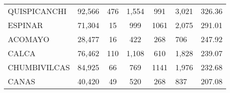 \begin{tabular}{lrccclr}
		\cellcolor[HTML]{FFE699}QUISPICANCHI                           & 92,566                                                         & 476                                                         & 1,554                & 991                      & 3,021                                                               & 326.36                                                                       \\
		\cellcolor[HTML]{FFE699}ESPINAR                                & 71,304                                                         & 15                                                          & 999                  & 1061                     & 2,075                                                               & 291.01                                                                       \\
		\cellcolor[HTML]{FFE699}ACOMAYO                                & 28,477                                                         & 16                                                          & 422                  & 268                      & 706                                                                 & 247.92                                                                       \\
		\cellcolor[HTML]{FFE699}CALCA                                  & 76,462                                                         & 110                                                         & 1,108                & 610                      & 1,828                                                               & 239.07                                                                       \\
		\cellcolor[HTML]{FFE699}CHUMBIVILCAS                           & 84,925                                                         & 66                                                          & 769                  & 1141                     & 1,976                                                               & 232.68                                                                       \\
		\cellcolor[HTML]{C6E0B4}CANAS                                  & 40,420                                                         & 49                                                          & 520                  & 268                      & 837                                                                 & 207.08                                                                       \\

\end{tabular}
